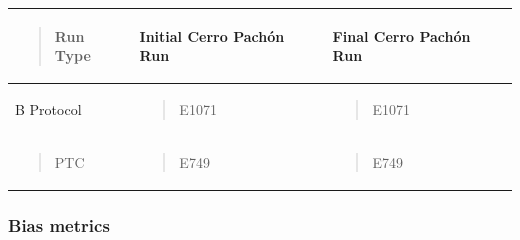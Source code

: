 \begin{longtable}[]{@{}
  >{\raggedright\arraybackslash}p{}
  >{\raggedright\arraybackslash}p{}
  >{\raggedright\arraybackslash}p{}@{}}
\toprule\noalign{}
\begin{minipage}[b]{\linewidth}\raggedright
\begin{quote}
Run Type
\end{quote}
\end{minipage} & \begin{minipage}[b]{\linewidth}\raggedright
Initial Cerro Pachón Run
\end{minipage} & \begin{minipage}[b]{\linewidth}\raggedright
Final Cerro Pachón Run
\end{minipage} \\
\midrule\noalign{}
\endhead
\bottomrule\noalign{}
\endlastfoot
B Protocol & \begin{minipage}[t]{\linewidth}\raggedright
\begin{quote}
E1071
\end{quote}
\end{minipage} & \begin{minipage}[t]{\linewidth}\raggedright
\begin{quote}
E1071
\end{quote}
\end{minipage} \\
\begin{minipage}[t]{\linewidth}\raggedright
\begin{quote}
PTC
\end{quote}
\end{minipage} & \begin{minipage}[t]{\linewidth}\raggedright
\begin{quote}
E749
\end{quote}
\end{minipage} & \begin{minipage}[t]{\linewidth}\raggedright
\begin{quote}
E749
\end{quote}
\end{minipage} \\
\end{longtable}

\subsubsection{Bias metrics}\label{bias-metrics}

